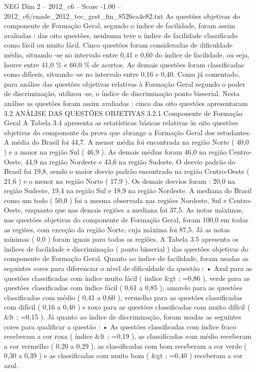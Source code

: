 \begin{textsample}{NEG Dim 2 – 2012\_c6 – Score -1.00 – 2012\_c6/enade\_2012\_tec\_gest\_fin\_8526ca4e82.txt}
As questões objetivas do componente de Formação Geral, segundo o índice de facilidade, foram assim avaliadas : das oito questões, nenhuma teve o índice de facilidade classificado como fácil ou muito fácil.
Cinco questões foram consideradas de dificuldade média, situando -se no intervalo entre 0,41 e 0,60 do índice de facilidade, ou seja, houve entre 41,0 \% e 60,0 \% de acertos.
As demais questões foram classificadas como difíceis, situando -se no intervalo entre 0,16 e 0,40.
Como já comentado, para análise das questões objetivas relativas à Formação Geral segundo o poder de discriminação, utilizou -se, o índice de discriminação ponto bisserial.
Nesta análise as questões foram assim avaliadas : cinco das oito questões apresentaram 3.2 ANÁLISE DAS QUESTÕES OBJETIVAS 3.2.1 Componente de Formação Geral A Tabela 3.4 apresenta as estatísticas básicas relativas às oito questões objetivas do componente da prova que abrange a Formação Geral dos estudantes.
A média do Brasil foi 44,7.
A menor média foi encontrada na região Norte ( 40,0 ) e a maior na região Sul ( 46,9 ).
As demais médias foram 46,0 na região Centro-Oeste, 44,9 na região Nordeste e 43,6 na região Sudeste.
O desvio padrão do Brasil foi 19,8, sendo o maior desvio padrão encontrado na região Centro-Oeste ( 21,6 ) e o menor na região Norte ( 17,9 ).
Os demais desvios foram : 20,0 na região Sudeste, 19,4 na região Sul e 18,9 na região Nordeste.
A mediana do Brasil como um todo ( 50,0 ) foi a mesma observada nas regiões Nordeste, Sul e Centro-Oeste, enquanto que nas demais regiões a mediana foi 37,5.
As notas máximas, nas questões objetivas do componente de Formação Geral, foram 100,0 em todas as regiões, com exceção da região Norte, cuja máxima foi 87,5.
Já as notas mínimas ( 0,0 ) foram iguais para todas as regiões.
A Tabela 3.5 apresenta os índices de facilidade e discriminação ( ponto bisserial ) das questões objetivas do componente de Formação Geral.
Quanto ao índice de facilidade, foram usadas as seguintes cores para diferenciar o nível de dificuldade da questão : • Azul para as questões classificadas com índice muito fácil ( índice \&gt ; =0,86 ), verde para as questões classificadas com índice fácil ( 0,61 a 0,85 ), amarelo para as questões classificadas com médio ( 0,41 a 0,60 ), vermelho para as questões classificadas com difícil ( 0,16 a 0,40 ) e roxo para as questões classificadas com muito difícil ( \&lt ; =0,15 ).
Já quanto ao índice de discriminação, foram usadas as seguintes cores para qualificar a questão : • As questões classificadas com índice fraco receberam a cor roxa ( índice \&lt ; =0,19 ), as classificadas com médio receberam a cor vermelho ( 0,20 a 0,29 ), as classificadas com bom receberam a cor verde ( 0,30 a 0,39 ) e as classificadas com muito bom ( \&gt ; =0,40 ) receberam a cor azul.

\end{textsample}
